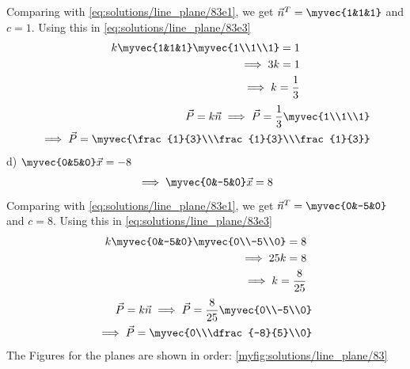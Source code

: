Comparing with \eqref{eq:solutions/line_plane/83e1}, we get $\vec{n}^T = \myvec{1&1&1}$ and  $c=1$. Using this in \eqref{eq:solutions/line_plane/83e3}
\begin{align}
	k\myvec{1&1&1}\myvec{1\\1\\1} = 1\\
	\implies 3k = 1\\
	\implies k = \frac{1}{3}
\end{align}
\begin{align}
	\vec{P} = k\vec{n}
	\implies\vec{P} = \frac{1}{3}\myvec{1\\1\\1}\\
	\implies\vec{P}= \myvec{\frac{1}{3}\\\frac{1}{3}\\\frac{1}{3}}
\end{align}
d) $\myvec{0&5&0}\vec{x} = -8$
\begin{align}
    \nonumber\implies\myvec{0&-5&0}\vec{x} = 8
\end{align}
Comparing with \eqref{eq:solutions/line_plane/83e1}, we get $\vec{n}^T = \myvec{0&-5&0}$ and  $c=8$. Using this in \eqref{eq:solutions/line_plane/83e3}
\begin{align}
	k\myvec{0&-5&0}\myvec{0\\-5\\0} = 8\\
	\implies 25k = 8\\
	\implies k = \frac{8}{25}
\end{align}
\begin{align}
	\vec{P} = k\vec{n}
	\implies\vec{P} = \frac{8}{25}\myvec{0\\-5\\0}\\
	\implies\vec{P}= \myvec{0\\\dfrac{-8}{5}\\0}
\end{align}
The Figures for the planes are shown in order:
\ref{myfig:solutions/line_plane/83}
